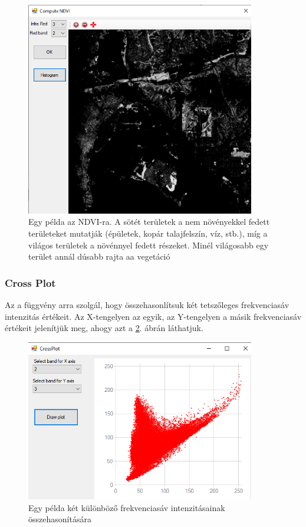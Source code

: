 \documentclass[a4paper,12pt]{article}
\begin{document}
\begin{figure}
	\centering
	\includegraphics[width=10cm]{ndvi_pelda.png}
	\caption{Egy példa az NDVI-ra. A sötét területek a nem növényekkel fedett területeket mutatják (épületek, kopár talajfelszín, víz, stb.), míg a világos területek a növénnyel fedett részeket. Minél világosabb egy terület annál dúsabb rajta aa vegetáció}
	\label{fig:ndvi_pelda}
\end{figure}



\subsubsection{Cross Plot}

Az a függvény arra szolgál, hogy összehasonlítsuk két tetszőleges frekvenciasáv intenzitás értékeit. Az X-tengelyen az egyik, az Y-tengelyen a másik frekvenciasáv értékeit jelenítjük meg, ahogy azt a \ref{fig:crPlot}.  ábrán láthatjuk.

\begin{figure}
	\centering
	\includegraphics[width=10cm]{crPlot.png}
	\caption{Egy példa két különböző frekvenciasáv intenzitásainak összehasonítására}
	\label{fig:crPlot}
\end{figure}
\end{document}
